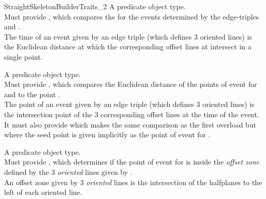 \begin{ccRefConcept}{StraightSkeletonBuilderTraits_2}
{A predicate object type.\\
Must provide , which compares the  for the events determined by the edge-triples  and .\\
The time of an event given by an edge triple (which defines 3 oriented lines) is the Euclidean distance  at which the corresponding offset lines at  intersect in a single point.\\
}

{A predicate object type.\\
Must provide , which compares the Euclidean distance of the points of event for  and  to the point .\\
The point of an event given by an edge triple (which defines 3 oriented lines) is the intersection point of the 3 corresponding offset lines at the time  of the event.\\
It must also provide  which makes the same comparison as the first overload but where the seed point is given implicitly as the point of event for .\\
}

{A predicate object type.\\
Must provide , which determines if the point of event for  is inside the \textit{offset zone} defined by the 3 \textit{oriented} lines given by .\\
An offset zone given by 3 \textit{oriented} lines is the intersection of the halfplanes to the left of each oriented line.\\
}


\end{ccRefConcept}
